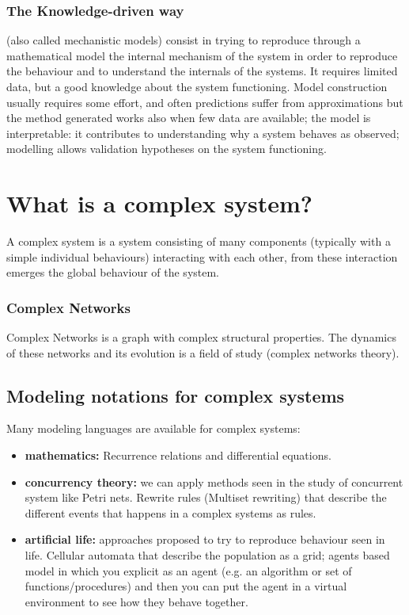\subsubsection{The Knowledge-driven way} (also called mechanistic models) consist in trying to reproduce through a mathematical model the internal mechanism of the system in order to reproduce the behaviour and to understand the internals of the systems. It requires limited data, but a good knowledge about the system functioning. Model construction usually requires some effort, and often predictions suffer from approximations but the method generated works also when few data are available; the model is interpretable: it contributes to understanding why a system behaves as observed; modelling allows validation hypotheses on the system functioning.

\section{What is a complex system?}
A complex system is a system consisting of many components (typically with a simple individual behaviours) interacting with each other, from these interaction emerges the global behaviour of the system.

\subsubsection{Complex Networks}
Complex Networks is a graph with complex structural properties. The dynamics of these networks and its evolution is a field of study (complex networks theory).

\subsection{Modeling notations for complex systems}
Many modeling languages are available for complex systems:

\begin{itemize}
    \item \textbf{mathematics:} Recurrence relations and differential equations.

    \item \textbf{concurrency theory:} we can apply methods seen in the study of concurrent system like Petri nets. Rewrite rules (Multiset rewriting) that describe the different events that happens in a complex systems as rules.

    \item \textbf{artificial life:} approaches proposed to try to reproduce behaviour seen in life. Cellular automata that describe the population as a grid; agents based model in which you explicit as an agent (e.g. an algorithm or set of functions/procedures) and then you can put the agent in a virtual environment to see how they behave together. 
\end{itemize}

